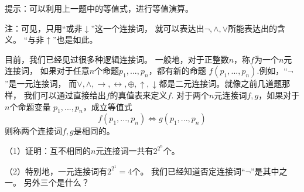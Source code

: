 提示：可以利用上一题中的等值式，进行等值演算。\vs


注：可见，只用“或非$\downarrow$”这一个连接词，
就可以表达出$\neg,\wedge,\vee$所能表达出的含义。
“与非$\uparrow$”也是如此。\vs

\begin{prob}[一般的多元连接词]
目前，我们已经见过很多种逻辑连接词。
一般地，对于正整数$n$，称$f$为一个$n$元连接词，
如果对于任意$n$个命题$p_1,...,p_n$，都有新的命题
$f(p_1,...,p_n)$.例如，“$\neg$”是一元连接词，
而$\vee,\wedge,\rightarrow,\leftrightarrow,\oplus,
\uparrow,\downarrow$都是二元连接词。就像之前几道题那样，
我们可以通过直接给出$f$的真值表来定义$f$.
对于两个$n$元连接词$f,g$，如果对于$n$个命题变量
$p_1,...,p_n$，成立等值式
$$f(p_1,...,p_n)\Leftrightarrow g(p_1,...,p_n)$$
则称两个连接词$f,g$是相同的。

（1）证明：互不相同的$n$元连接词一共有$2^{2^n}$个。

（2）特别地，一元连接词有$2^{2^1}=4$个。
我们已经知道否定连接词“$\neg$”是其中之一。
另外三个是什么？
\end{prob}\vs


